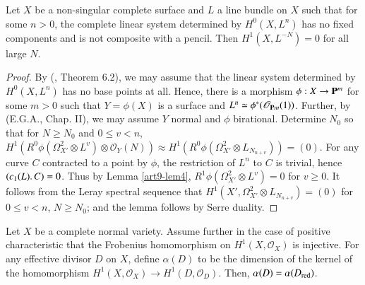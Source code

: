 \begin{lem}\label{art9-lem5}
Let $X$ be a non-singular complete surface and $L$ a line bundle on $X$ such that for some $n>0$, the complete linear system determined by $H^0 (X, L^n)$ has no fixed components and is not composite with a pencil. Then $H^1 (X, L^{-N}) =0$  for all large $N$.
\end{lem}

\begin{proof}
By (\cite{art9-key10}, Theorem 6.2), we may assume that the linear system
determined by $H^0 (X,L^n)$ has no base points at all. Hence, there is
a morphism $\phi: X \to \mathbf{P}^m$ for some $m>0$ such that $Y = \phi
(X)$ is a surface and $L^n \simeq \phi^* (\mathscr{O}_{\mathbf{P}
m}(1))$. Further, by (E.G.A., Chap. II), we may assume $Y$ normal and
$\phi$ birational. Determine $N_0$ so that for $N \geqslant N_0$ and
$0 \leqslant v < n$, $H^1 (R^0 \phi (\Omega^2_{X'} \otimes
L^v) \otimes \mathscr{O}_Y (N)) \approx H^1 (R^0 \phi
(\Omega^2_{X'} \otimes L_{N_{n+v}})) = (0)$. For any curve $C$
contracted to a point by $\phi$, the restriction of $L^n$ to $C$ is
trivial, hence $(c_1 (L) \ldotp C)=0$. Thus by Lemma \ref{art9-lem4}, $R^1 \phi
(\Omega^2_{X'} \otimes L^v) =0$ for $v \geqslant 0$. It follows from
the Leray spectral sequence that $H^1 (X', \Omega^2_{X'} \otimes
L_{N_{n+v}} ) =(0)$ for $0 \leqslant v < n$, $N \geqslant N_0$; and
the lemma follows by Serre duality.

\end{proof}   
   


\begin{lem}\label{art9-lem6}%
Let $X$ be a complete normal variety. Assume further in the case of positive characteristic that the Frobenius homomorphism on $H^1(X, \mathscr{O}_X)$ is injective. For any effective divisor $D$ on $X$, define $\alpha (D)$ to be the dimension of the kernel of the homomorphism $H^1 (X, \mathscr{O}_X) \to H^1 (D, \mathscr{O}_D)$. Then, $\alpha (D) = \alpha (D_{\operatorname{red}})$.
\end{lem}

